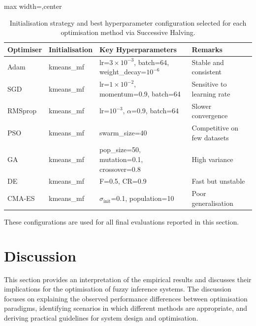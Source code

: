 \documentclass[a4paper,12pt,oneside]{article}
\begin{document}
\begin{table}[H]
\centering
\caption{Initialisation strategy and best hyperparameter configuration selected for each optimisation method via Successive Halving.}
\label{tab:best_configs}

\begin{adjustbox}{max width=\textwidth,center}
\begin{tabular}{llll}
\toprule
\textbf{Optimiser} & \textbf{Initialisation} & \textbf{Key Hyperparameters} & \textbf{Remarks} \\
\midrule
Adam 
& kmeans\_mf 
& lr=$3\times10^{-3}$, batch=64, weight\_decay=$10^{-6}$ 
& Stable and consistent \\

SGD 
& kmeans\_mf 
& lr=$1\times10^{-2}$, momentum=0.9, batch=64 
& Sensitive to learning rate \\

RMSprop 
& kmeans\_mf 
& lr=$10^{-3}$, $\alpha$=0.9, batch=64 
& Slower convergence \\

PSO 
& kmeans\_mf 
& swarm\_size=40 
& Competitive on few datasets \\

GA 
& kmeans\_mf 
& pop\_size=50, mutation=0.1, crossover=0.8 
& High variance \\

DE 
& kmeans\_mf 
& F=0.5, CR=0.9 
& Fast but unstable \\

CMA-ES 
& kmeans\_mf 
& $\sigma_{\text{init}}$=0.1, population=10 
& Poor generalisation \\
\bottomrule
\end{tabular}
\end{adjustbox}

\end{table}


These configurations are used for all final evaluations reported in this section. 



\newpage
\section{Discussion}

This section provides an interpretation of the empirical results and discusses their implications for the optimisation of fuzzy inference systems. The discussion focuses on explaining the observed performance differences between optimisation paradigms, identifying scenarios in which different methods are appropriate, and deriving practical guidelines for system design and optimisation.
\end{document}
